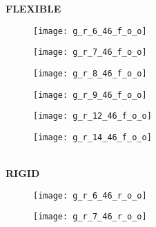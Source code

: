 \documentclass[12pt]{article}
\begin{document}
  \begin{figure}[htbp!]
   \centering
   \textbf{FLEXIBLE} \\
  \begin{subfigure}[b]{0.15\textwidth}
    \texttt{[image: g\_r\_6\_46\_f\_o\_o]}
    \vspace{-15pt} \caption{}
    \label{fig:rg_6_f}
  \end{subfigure}
  \begin{subfigure}[b]{0.15\textwidth}
    \texttt{[image: g\_r\_7\_46\_f\_o\_o]}
     \vspace{-15pt} \caption{}
    \label{fig:rg_7_f}
  \end{subfigure}
  \begin{subfigure}[b]{0.15\textwidth}
    \texttt{[image: g\_r\_8\_46\_f\_o\_o]}
    \vspace{-15pt} \caption{}
    \label{fig:rg_8_f}
  \end{subfigure}
    \begin{subfigure}[b]{0.15\textwidth}
    \texttt{[image: g\_r\_9\_46\_f\_o\_o]}
    \vspace{-15pt} \caption{}
    \label{fig:rg_9_f}
  \end{subfigure}
  \begin{subfigure}[b]{0.15\textwidth}
    \texttt{[image: g\_r\_12\_46\_f\_o\_o]}
     \vspace{-15pt} \caption{}
    \label{fig:rg_12_f}
  \end{subfigure}
  \begin{subfigure}[b]{0.15\textwidth}
    \texttt{[image: g\_r\_14\_46\_f\_o\_o]}
    \vspace{-15pt} \caption{}
    \label{fig:rg_14_f}
  \end{subfigure} \\  \vspace{-10pt} 
 \textbf{RIGID} \\
  \begin{subfigure}[b]{0.15\textwidth}
    \texttt{[image: g\_r\_6\_46\_r\_o\_o]}
     \vspace{-15pt} \caption{}
    \label{fig:rg_6_r}
  \end{subfigure}
  \begin{subfigure}[b]{0.15\textwidth}
    \texttt{[image: g\_r\_7\_46\_r\_o\_o]}
     \vspace{-15pt} \caption{}
    \label{fig:rg_7_r}
  \end{subfigure}

\end{figure}
\end{document}
